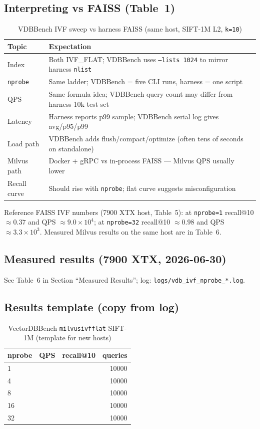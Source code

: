 \documentclass[11pt,a4paper]{article}
\begin{document}
\subsection{Interpreting vs FAISS (Table~1)}

\begin{table}[h]
\centering
\caption{VDBBench IVF sweep vs harness FAISS (same host, SIFT-1M L2, \texttt{k=10})}
\begin{tabular}{@{}ll@{}}
\toprule
\textbf{Topic} & \textbf{Expectation} \\
\midrule
Index & Both IVF\_FLAT; VDBBench uses \texttt{--lists 1024} to mirror harness \texttt{nlist} \\
\texttt{nprobe} & Same ladder; VDBBench = five CLI runs, harness = one script \\
QPS & Same formula idea; VDBBench query count may differ from harness 10k test set \\
Latency & Harness reports p99 sample; VDBBench serial log gives avg/p95/p99 \\
Load path & VDBBench adds flush/compact/optimize (often tens of seconds on standalone) \\
Milvus path & Docker + gRPC vs in-process FAISS --- Milvus QPS usually lower \\
Recall curve & Should rise with \texttt{nprobe}; flat curve suggests misconfiguration \\
\bottomrule
\end{tabular}
\end{table}

Reference FAISS IVF numbers (7900 XTX host, Table~5): at \texttt{nprobe=1} recall@10
$\approx 0.37$ and QPS $\approx 9.0\times 10^4$; at \texttt{nprobe=32} recall@10
$\approx 0.98$ and QPS $\approx 3.3\times 10^3$. Measured Milvus results on the same host
are in Table~6.

\subsection{Measured results (7900 XTX, 2026-06-30)}

See Table~6 in Section ``Measured Results''; log:
\texttt{logs/vdb\_ivf\_nprobe\_*.log}.

\subsection{Results template (copy from log)}

\begin{table}[h]
\centering
\caption{VectorDBBench \texttt{milvusivfflat} SIFT-1M (template for new hosts)}
\begin{tabular}{@{}lrrr@{}}
\toprule
\textbf{nprobe} & \textbf{QPS} & \textbf{recall@10} & \textbf{queries} \\
\midrule
1  &  &  & 10000 \\
4  &  &  & 10000 \\
8  &  &  & 10000 \\
16 &  &  & 10000 \\
32 &  &  & 10000 \\
\bottomrule
\end{tabular}
\end{table}
\end{document}
